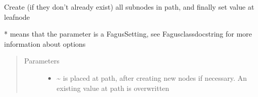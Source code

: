 \documentclass[a4paper,10pt,english]{sphinxmanual}
\begin{document}
\begin{fulllineitems}
\begin{fulllineitems}
\begin{quote}
\begin{description}
\end{description}\end{quote}

\end{fulllineitems}


\begin{fulllineitems}
\label{\detokenize{fagus.fagus:fagus.fagus.Fagus.set}}
\pysigstartsignatures
{}
\pysigstopsignatures
\sphinxAtStartPar
Create (if they don’t already exist) all sub\sphinxhyphen{}nodes in path, and finally set value at leaf\sphinxhyphen{}node

\sphinxAtStartPar
* means that the parameter is a Fagus\sphinxhyphen{}Setting, see Fagus\sphinxhyphen{}class\sphinxhyphen{}docstring for more information about options
\begin{quote}\begin{description}
\item[{Parameters}] \leavevmode\begin{itemize}
\item {}
\sphinxAtStartPar
{} \textendash{} \textasciitilde{} is placed at path, after creating new nodes if necessary. An existing value at path is overwritten


\end{itemize}
\end{description}
\end{quote}
\end{fulllineitems}
\end{fulllineitems}
\end{document}
